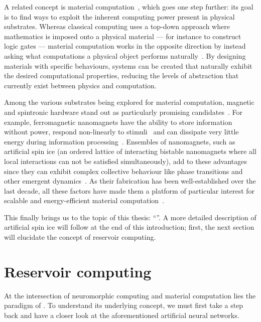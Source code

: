 A related concept is material computation~\cite{NeglectedPillar}, which goes one step further: its goal is to find ways to exploit the inherent computing power present in physical substrates.
Whereas classical computing uses a top-down approach where mathematics is imposed onto a physical material --- for instance to construct logic gates --- material computation works in the opposite direction by instead asking what computations a physical object performs naturally~\cite{RC_ASI}.
By designing materials with specific behaviours, systems can be created that naturally exhibit the desired computational properties, reducing the levels of abstraction that currently exist between physics and computation. \par
Among the various substrates being explored for material computation, magnetic and spintronic hardware stand out as particularly promising candidates~\cite{grollier2020neuromorphic,NeuromorphicSpintronicsProspect}.
For example, ferromagnetic nanomagnets have the ability to store information without power, respond non-linearly to stimuli~\cite{NeuromorphicSpintronics} and can dissipate very little energy during information processing~\cite{ThermodynamicLimitsComputation,SpintronicsEnergyEfficientComputing}.
Ensembles of nanomagnets, such as artificial spin ice (an ordered lattice of interacting bistable nanomagnets where all local interactions can not be satisfied simultaneously), add to these advantages since they can exhibit complex collective behaviour like phase transitions and other emergent dynamics~\cite{NeuromorphicSpintronics,RC_ASI}.
As their fabrication has been well-established over the last decade, all these factors have made them a platform of particular interest for scalable and energy-efficient material computation~\cite{PhD_Stromberg}. \par
This finally brings us to the topic of this thesis: ``\emph{\phdtitle}''.
A more detailed description of artificial spin ice will follow at the end of this introduction; first, the next section will elucidate the concept of reservoir computing.


\newpage
\section{Reservoir computing}\label{sec:1:RC}
At the intersection of neuromorphic computing and material computation lies the paradigm of .
To understand its underlying concept, we must first take a step back and have a closer look at the aforementioned artificial neural networks.

